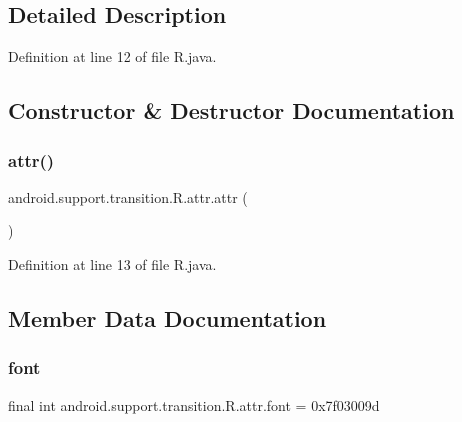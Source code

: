 \subsection{Detailed Description}


Definition at line 12 of file R.\+java.



\subsection{Constructor \& Destructor Documentation}
\mbox{\label{classandroid_1_1support_1_1transition_1_1_r_1_1attr_a99e46683fea0c772eeffe3ecdf368ee2}} 
\subsubsection{\texorpdfstring{attr()}{attr()}}
{\footnotesize\ttfamily android.\+support.\+transition.\+R.\+attr.\+attr (\begin{DoxyParamCaption}{ }\end{DoxyParamCaption})\hspace{0.3cm}{\ttfamily [private]}}



Definition at line 13 of file R.\+java.


\begin{DoxyCode}{0}

\end{DoxyCode}


\subsection{Member Data Documentation}
\mbox{\label{classandroid_1_1support_1_1transition_1_1_r_1_1attr_a03e0b314e887f913bd1270d40202af3d}} 
\subsubsection{\texorpdfstring{font}{font}}
{\footnotesize\ttfamily final int android.\+support.\+transition.\+R.\+attr.\+font = 0x7f03009d\hspace{0.3cm}{\ttfamily [static]}}



